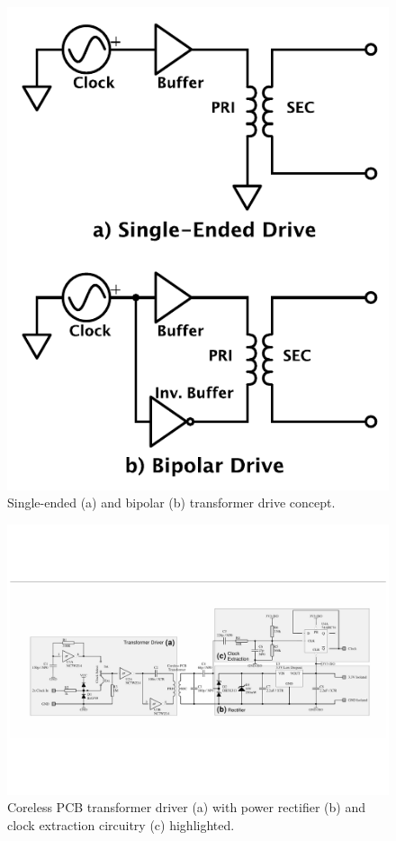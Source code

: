 \documentclass[conference]{IEEEtran}
\begin{document}
	\begin{figure}[t]
		\centering
		\includegraphics[width=0.6\columnwidth]{./img/BIvsSE}
		\caption{Single-ended (a) and bipolar (b) transformer drive concept.}
		\label{fig:BIvsSE}
	\end{figure}
	
	\begin{figure}[t]
		\centering
		\includegraphics[width=1.0\textwidth]{./img/TFpwrclk_BW}
		\caption{Coreless PCB transformer driver (a) with power rectifier (b) and clock extraction circuitry (c) highlighted.}
		\label{fig:TFpwrclk}
	\end{figure}	
	
\end{document}
